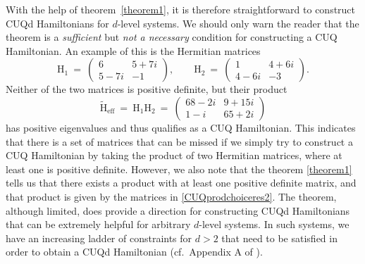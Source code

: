 \documentclass[12pt,a4paper]{article}
\begin{document}
With the help of theorem~\ref{theorem1}, it is therefore straightforward to construct CUQd Hamiltonians for $d$-level systems. We should only warn the reader that the theorem is a \textit{sufficient} but \textit{not a necessary} condition for constructing a CUQ Hamiltonian. An example of this is the Hermitian matrices
\begin{equation}
\mathrm{H}_1\: = \:\begin{pmatrix}
  6 & 5+7i \\
  5-7i & -1
\end{pmatrix},\qquad
\mathrm{H}_2 \:=\: \begin{pmatrix}
  1 & 4+6i \\
  4-6i & -3
\end{pmatrix}.
\end{equation}
Neither of the two matrices is positive definite, but their product 
\begin{equation}
\widetilde{\mathrm{H}}_{\text{eff}} \:=\: \mathrm{H}_1\mathrm{H}_2 \:=\: \begin{pmatrix}
  68-2i & 9+15i \\
  1-i & 65 +2i
\end{pmatrix} 
\end{equation}
has positive eigenvalues and thus qualifies as a CUQ Hamiltonian. This indicates that there is a set of matrices that can be missed if we simply try to construct a CUQ Hamiltonian by taking the product of two Hermitian matrices, where at least one is positive definite. However, we also note that the theorem \ref{theorem1} tells us that there exists a product with at least one positive definite matrix, and that product is given by the matrices in \eqref{CUQprodchoiceres2}. The theorem, although limited,  does provide a direction for constructing CUQd Hamiltonians that can be extremely helpful for arbitrary $d$-level systems. In such systems, we have an increasing ladder of constraints for $d>2$ that need to be satisfied in order to obtain a CUQd Hamiltonian (cf.~Appendix A of \cite{Karamitros:2023tqr}).

\newpage
{}

\end{document}
